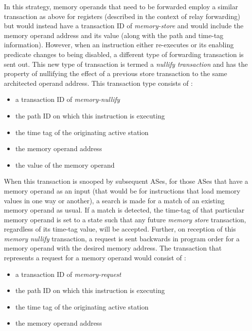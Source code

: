 \documentclass[10pt,dvips]{article}
\begin{document}
In this strategy, memory operands that need to be forwarded
employ a similar transaction as above for registers (described
in the context of relay forwarding) but would instead have
a transaction ID of \textit{memory-store} and would
include the memory operand address and its value (along with the
path and time-tag information).
However, when an instruction either re-executes or
its enabling predicate changes to being disabled, a different
type of forwarding transaction is sent out.
This new type of transaction is termed a \textit{nullify transaction}
and has the property of nullifying the effect of a previous
store transaction to the same architected operand address.
This transaction type consists of :
%
\vspace{-0.05in}
\begin{itemize}
\vspace{-0.1in}
\item{a transaction ID of \textit{memory-nullify}}
\vspace{-0.1in}
\item{the path ID on which this instruction is executing}
\vspace{-0.1in}
\item{the time tag of the originating active station}
\vspace{-0.1in}
\item{the memory operand address}
\vspace{-0.1in}
\item{the value of the memory operand}
\vspace{-0.1in}
\end{itemize}   
%
When this transaction is snooped by subsequent ASes,
for those ASes that have a memory operand as an input
(that would be for instructions that load memory values in
one way or another),
a search is made for a match of an existing memory
operand as usual.  
If a match is detected,
the time-tag of that particular memory operand is set to
a state such that any future \textit{memory store} transaction,
regardless of its time-tag value, will be accepted.
Further, on reception of this \textit{memory nullify} transaction,
a request is sent backwards in program order for a memory
operand with the desired memory address.
The transaction that represents a request for a memory
operand would consist of :
%
\vspace{-0.05in}
\begin{itemize}
\vspace{-0.1in}
\item{a transaction ID of \textit{memory-request}}
\vspace{-0.1in}
\item{the path ID on which this instruction is executing}
\vspace{-0.1in}
\item{the time tag of the originating active station}
\vspace{-0.1in}
\item{the memory operand address}
\vspace{-0.1in}
\end{itemize}   
\end{document}
